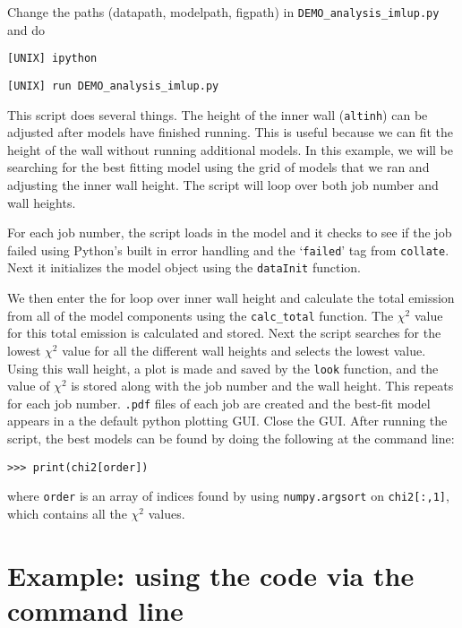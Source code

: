 \documentclass{article}
\begin{document}
\noindent Change the paths (datapath, modelpath, figpath) in \texttt{DEMO\_analysis\_imlup.py} and do 

\vspace{2mm}
\texttt{[UNIX] ipython}
\vspace{2mm}

\vspace{2mm}
\texttt{[UNIX] run DEMO\_analysis\_imlup.py}
\vspace{2mm}

\noindent This script does several things.  The height of the inner wall (\texttt{altinh}) can be adjusted after models have finished running. This is useful because we can fit the height of the wall without running additional models. 
In this example, we will be searching for the best fitting model using the grid of models that we ran and adjusting the inner wall height. The script will loop over both job number and wall heights.
\vspace{2mm}

\noindent For each job number, the script loads in the model and it checks to see if the job failed using Python's built in error handling and the `\texttt{failed}' tag from \texttt{collate}. 
Next it initializes the model object using the \texttt{dataInit} function. 
\vspace{2mm}

\noindent We then enter the for loop over inner wall height and calculate the total emission from all of the model components using the \texttt{calc\_total} function. The $\chi^2$ value for this total emission is calculated and stored. Next the script searches for the lowest $\chi^2$ value for all the different wall heights and selects the lowest value. Using this wall height, a plot is made and saved by the \texttt{look} function, and the value of $\chi^2$ is stored along with the job number and the wall height. This repeats for each job number. \texttt{.pdf} files of each job are created and the best-fit model appears in a the default python plotting GUI. Close the GUI. After running the script, the best models can be found by doing the following at the command line:

\vspace{2mm}
\texttt{>>> print(chi2[order])}
\vspace{2mm}

\noindent where \texttt{order} is an array of indices found by using \texttt{numpy.argsort} on \texttt{chi2[:,1]}, which contains all the $\chi^2$ values. 

\section{Example: using the code via the command line} \label{commandline}
\end{document}
